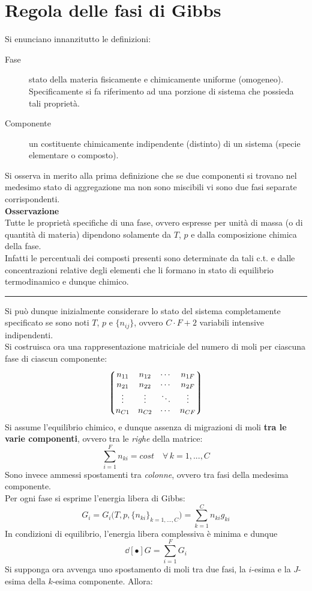 \documentclass[10pt, oneside]{book}
\newcommand{\infobox}[2]{\vspace{0.5cm}~\\ \textbf{#1} \hrulefill \vspace{0.2cm}\\#2 {}\,\\\hrule \vspace{0.5cm}}
\begin{document}
\section{Regola delle fasi di Gibbs}
Si enunciano innanzitutto le definizioni:
\begin{description}
\item[Fase] stato della materia fisicamente e chimicamente uniforme (omogeneo). Specificamente si fa riferimento ad una porzione di sistema che possieda tali proprietà.
\item[Componente] un costituente chimicamente indipendente (distinto) di un sistema (specie elementare o composto).
\end{description}
Si osserva in merito alla prima definizione che se due componenti si trovano nel medesimo stato di aggregazione ma non sono miscibili vi sono due fasi separate corrispondenti.
\infobox{Osservazione}{Tutte le proprietà specifiche di una fase, ovvero espresse per unità di massa (o di quantità di materia) dipendono solamente da $T$, $p$ e dalla composizione chimica della fase.\\
Infatti le percentuali dei composti presenti sono determinate da tali c.t. e dalle concentrazioni relative degli elementi che li formano in stato di equilibrio termodinamico e dunque chimico.}
Si può dunque inizialmente considerare lo stato del sistema completamente specificato se sono noti $T$, $p$ e $\{n_{ij}\}$, ovvero $C \cdot F + 2$ variabili intensive indipendenti.\\
Si costruisca ora una rappresentazione matriciale del numero di moli per ciascuna fase di ciascun componente:
\[\mqty*(n_{11} & n_{12} & \cdots & n_{1F} \\ n_{21} & n_{22} & \cdots & n_{2F} \\ \vdots & \vdots & \ddots & \vdots \\ n_{C1} & n_{C2} & \cdots & n_{CF})\]
Si assume l'equilibrio chimico, e dunque assenza di migrazioni di moli \textbf{tra le varie componenti}, ovvero tra le \textit{righe} della matrice:
\[\sum\limits_{i=1}^F n_{ki} = cost \quad \forall \, k = 1, ..., C\]
Sono invece ammessi spostamenti tra \textit{colonne}, ovvero tra fasi della medesima componente.\\
Per ogni fase si esprime l'energia libera di Gibbs:
\[G_i = G_i \big(T, p, \{n_{ki}\}_{k=1, ..., C}\big) = \sum\limits_{k=1}^C n_{ki} g_{ki}\]
In condizioni di equilibrio, l'energia libera complessiva è minima e dunque
\[\dd[•]{G} = \sum\limits_{i=1}^F G_i\]
Si supponga ora avvenga uno spostamento di moli tra due fasi, la $i$-esima e la $J$-esima della $k$-esima componente. Allora:
\end{document}
